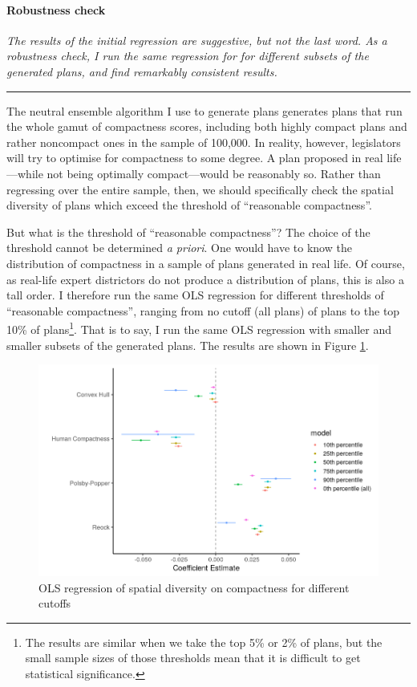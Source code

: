 \documentclass[]{article}
\let\oldparagraph\paragraph
\renewcommand{\paragraph}[1]{\oldparagraph{#1}\mbox{}}
\begin{document}
\hypertarget{robustness-check-1}{%
\paragraph{Robustness check}\label{robustness-check-1}}

\textsl{The results of the initial regression are suggestive, but not the last word. As
a robustness check, I run the same regression for for different subsets of the
generated plans, and find remarkably consistent results.}

\begin{center}\rule{0.5\linewidth}{\linethickness}\end{center}

The neutral ensemble algorithm I use to generate plans generates plans
that run the whole gamut of compactness scores, including both highly
compact plans and rather noncompact ones in the sample of 100,000. In
reality, however, legislators will try to optimise for compactness to
some degree. A plan proposed in real life---while not being optimally
compact---would be reasonably so. Rather than regressing over the entire
sample, then, we should specifically check the spatial diversity of
plans which exceed the threshold of ``reasonable compactness''.

But what is the threshold of ``reasonable compactness''? The choice of
the threshold cannot be determined \emph{a priori}. One would have to
know the distribution of compactness in a sample of plans generated in
real life. Of course, as real-life expert districtors do not produce a
distribution of plans, this is also a tall order. I therefore run the
same OLS regression for different thresholds of ``reasonable
compactness'', ranging from no cutoff (all plans) of plans to the top
10\% of plans\footnote{The results are similar when we take the top 5\%
  or 2\% of plans, but the small sample sizes of those thresholds mean
  that it is difficult to get statistical significance.}. That is to
say, I run the same OLS regression with smaller and smaller subsets of
the generated plans. The results are shown in Figure \ref{cutoffs}.

\begin{figure}
\centering
\includegraphics{../30_results/regression_coefficients_all.png}
\caption{OLS regression of spatial diversity on compactness for
different cutoffs \label{cutoffs}}
\end{figure}
\end{document}
